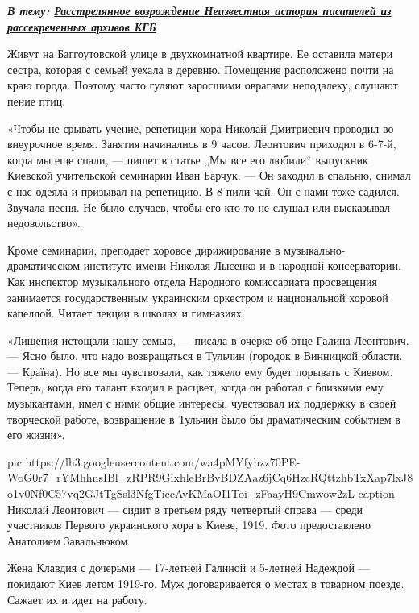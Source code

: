\begin{leftbar}
  \begingroup
    \em\Large\bfseries\color{blue}
В тему: \href{http://argumentua.com/stati/rasstrelyannoe-vozrozhdenie-neizvestnaya-istoriya-pisatelei-iz-rassekrechennykh-arkhivov-kgb}{Расстрелянное возрождение Неизвестная история писателей из рассекреченных архивов КГБ}
  \endgroup
\end{leftbar}

Живут на Баггоутовской улице в двухкомнатной квартире. Ее оставила матери
сестра, которая с семьей уехала в деревню. Помещение расположено почти на краю
города. Поэтому часто гуляют заросшими оврагами неподалеку, слушают пение птиц.

«Чтобы не срывать учение, репетиции хора Николай Дмитриевич проводил во
внеурочное время. Занятия начинались в 9 часов. Леонтович приходил в 6-7-й,
когда мы еще спали, — пишет в статье „Мы все его любили“ выпускник Киевской
учительской семинарии Иван Барчук. — Он заходил в спальню, снимал с нас одеяла
и призывал на репетицию. В 8 пили чай. Он с нами тоже садился. Звучала песня.
Не было случаев, чтобы его кто-то не слушал или высказывал недовольство».

Кроме семинарии, преподает хоровое дирижирование в музыкально-драматическом
институте имени Николая Лысенко и в народной консерватории. Как инспектор
музыкального отдела Народного комиссариата просвещения занимается
государственным украинским оркестром и национальной хоровой капеллой. Читает
лекции в школах и гимназиях.

«Лишения истощали нашу семью, — писала в очерке об отце Галина Леонтович. —
Ясно было, что надо возвращаться в Тульчин (городок в Винницкой области. —
Країна). Но все мы чувствовали, как тяжело ему будет порывать с Киевом. Теперь,
когда его талант входил в расцвет, когда он работал с близкими ему музыкантами,
имел с ними общие интересы, чувствовал их поддержку в своей творческой работе,
возвращение в Тульчин было бы драматическим событием в его жизни».

\ifcmt
pic https://lh3.googleusercontent.com/wa4pMYfyhzz70PE-WoG0r7_rYMhhnsIBl_zRPR9GixhleBrBvBDZAaz6jCq6HzcRQttzhbTxXap7lxJ8o1v0Nf0C57vq2GJtTgSsl3NfgTiccAvKMaOI1Toi_zFaayH9Cmwow2zL
caption Николай Леонтович — сидит в третьем ряду четвертый справа — среди участников Первого украинского хора в Киеве, 1919. Фото предоставлено Анатолием Завальнюком
\fi

Жена Клавдия с дочерьми — 17-летней Галиной и 5-летней Надеждой — покидают Киев
летом 1919-го. Муж договаривается о местах в товарном поезде. Сажает их и идет
на работу.

